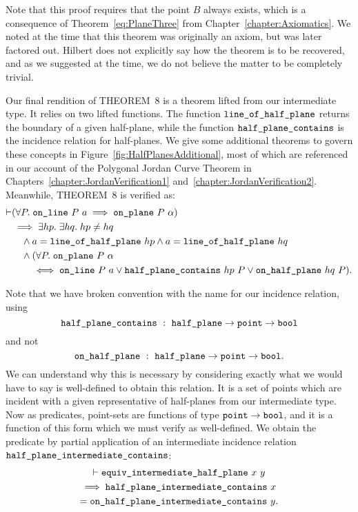 Note that this proof requires that the point $B$ always exists, which is a consequence of Theorem~\ref{eq:PlaneThree} from Chapter~\ref{chapter:Axiomatics}. We noted at the time that this theorem was originally an axiom, but was later factored out. Hilbert does not explicitly say how the theorem is to be recovered, and as we suggested at the time, we do not believe the matter to be completely trivial.

Our final rendition of THEOREM~8 is a theorem lifted from our intermediate type. It relies on two lifted functions. The function $\texttt{line\_of\_half\_plane}$ returns the boundary of a given half-plane, while the function $\texttt{half\_plane\_contains}$ is the incidence relation for half-planes. We give some additional theorems to govern these concepts in Figure~\ref{fig:HalfPlanesAdditional}, most of which are referenced in our  account of the Polygonal Jordan Curve Theorem in Chapters~\ref{chapter:JordanVerification1} and~\ref{chapter:JordanVerification2}. Meanwhile, THEOREM~8 is verified as:
\begin{equation}\label{eq:HalfPlaneCover}
  \begin{split}
    \vdash&(\forall P.\;\texttt{on\_line}\ P\ a \implies \texttt{on\_plane}\ P\ \alpha)\\
    &\implies \exists hp.\;\exists hq.\; hp \neq hq\\
    &\quad \wedge a = \texttt{line\_of\_half\_plane}\ hp \wedge a = \texttt{line\_of\_half\_plane}\ hq\\
    &\quad \wedge (\forall P.\;\texttt{on\_plane}\ P\ \alpha\\
    &\quad\quad \iff \texttt{on\_line}\ P\ a \vee \texttt{half\_plane\_contains}\ hp\ P \vee \texttt{on\_half\_plane}\ hq\ P).
  \end{split}
\end{equation}

Note that we have broken convention with the name for our incidence relation, using 
\begin{displaymath}
\code{half\_plane\_contains}\ :\ \code{half\_plane}\rightarrow\code{point}\rightarrow\code{bool}
\end{displaymath}
and not 
\begin{displaymath}
\code{on\_half\_plane}\ :\ \code{half\_plane}\rightarrow\code{point}\rightarrow\code{bool}.
\end{displaymath}
We can understand why this is necessary by considering exactly what we would have to say is well-defined to obtain this relation. It is a set of points which are incident with a given representative of half-planes from our intermediate type. Now as predicates, point-sets are functions of type $\texttt{point} \rightarrow \texttt{bool}$, and it is a function of this form which we must verify as well-defined. We obtain the predicate by partial application of an intermediate incidence relation $\texttt{half\_plane\_intermediate\_contains}$:
\begin{multline*}
\vdash\texttt{equiv\_intermediate\_half\_plane}\ x\ y \\
\implies \texttt{half\_plane\_intermediate\_contains}\ x\\ =\texttt{on\_half\_plane\_intermediate\_contains}\ y.
\end{multline*}

